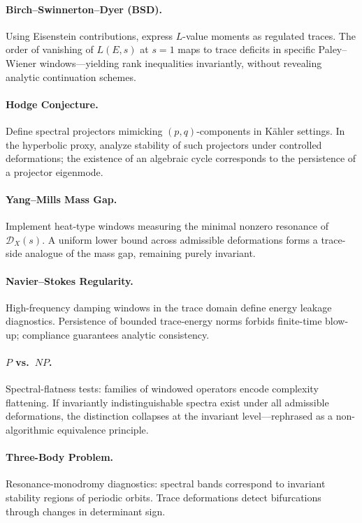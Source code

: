 \paragraph{Birch–Swinnerton–Dyer (BSD).}  
Using Eisenstein contributions, express $L$-value moments as regulated traces.  
The order of vanishing of $L(E,s)$ at $s=1$ maps to trace deficits in specific Paley–Wiener windows—yielding rank inequalities invariantly, without revealing analytic continuation schemes.

\paragraph{Hodge Conjecture.}  
Define spectral projectors mimicking $(p,q)$-components in Kähler settings.  
In the hyperbolic proxy, analyze stability of such projectors under controlled deformations; the existence of an algebraic cycle corresponds to the persistence of a projector eigenmode.

\paragraph{Yang--Mills Mass Gap.}  
Implement heat-type windows measuring the minimal nonzero resonance of $\mathscr{D}_X(s)$.  
A uniform lower bound across admissible deformations forms a trace-side analogue of the mass gap, remaining purely invariant.

\paragraph{Navier–Stokes Regularity.}  
High-frequency damping windows in the trace domain define energy leakage diagnostics.  
Persistence of bounded trace-energy norms forbids finite-time blow-up; compliance guarantees analytic consistency.

\paragraph{$P$ vs.\ $NP$.}  
Spectral-flatness tests: families of windowed operators encode complexity flattening.  
If invariantly indistinguishable spectra exist under all admissible deformations, the distinction collapses at the invariant level—rephrased as a non-algorithmic equivalence principle.

\paragraph{Three-Body Problem.}  
Resonance-monodromy diagnostics: spectral bands correspond to invariant stability regions of periodic orbits.  
Trace deformations detect bifurcations through changes in determinant sign.

